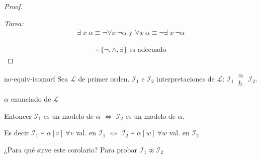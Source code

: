 \begin{proof}
\begin{enumerate}
        \textit{Tarea:}
        \begin{gather*}
            \exists \; x ~ \alpha \equiv \neg \forall x ~ \neg \alpha
            \text{ y }
            \forall x ~ \alpha \equiv \neg \exists \; x ~ \neg \alpha
        \end{gather*}
      \end{enumerate}

      \begin{gather*}
          \therefore ~ \{  \neg, \wedge, \exists \} \text{ es adecuado}
      \end{gather*}

\end{proof}

\begin{corolario}{}{no-equiv-isomorf}
    Sea $\mathcal{L}$ de primer orden.
    $\mathcal{I}_1$ e $\mathcal{I}_2$ interpretaciones de $\mathcal{L}$:
    $\mathcal{I}_1 ~\substack{\approx\\ h}~ \mathcal{I}_2$.

    $\alpha$ enunciado de $\mathcal{L}$

    \medskip

    Entonces $\mathcal{I}_1$ es un modelo de $\alpha$ $\iff$
    $\mathcal{I}_2$ es un modelo de $\alpha$.

    Es decir $\mathcal{I}_1 \vDash \alpha [v] ~ \forall v$ val. en 
    $\mathcal{I}_1$  $\iff$
    $\mathcal{I}_2 \vDash \alpha [w] ~ \forall w$ val. en 
    $\mathcal{I}_2$
\end{corolario}

¿Para qué sirve este corolario? 
Para probar $\mathcal{I}_1 \not \approx \mathcal{I}_2$

